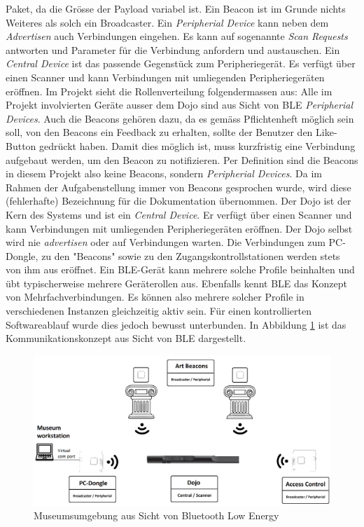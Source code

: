 Paket, da die Grösse der Payload variabel ist. Ein Beacon ist im Grunde nichts Weiteres als solch ein
Broadcaster.
Ein \textit{Peripherial Device} kann neben dem \textit{Advertisen} auch Verbindungen eingehen.
Es kann auf sogenannte \textit{Scan Requests} antworten und Parameter für die Verbindung anfordern und austauschen. 
Ein \textit{Central Device} ist das passende Gegenstück zum Peripheriegerät. Es verfügt über einen Scanner und 
kann Verbindungen mit umliegenden Peripheriegeräten eröffnen.
Im Projekt sieht die Rollenverteilung folgendermassen aus:
Alle im Projekt involvierten Geräte ausser dem Dojo sind aus Sicht von BLE \textit{Peripherial Devices}. Auch 
die Beacons gehören dazu, da es gemäss Pflichtenheft möglich sein soll, von den Beacons ein Feedback
zu erhalten, sollte der Benutzer den Like-Button gedrückt haben. Damit dies möglich ist, muss kurzfristig 
eine Verbindung aufgebaut werden, um den Beacon zu notifizieren. Per Definition sind die Beacons in
diesem Projekt also keine Beacons, sondern \textit{Peripherial Devices}. Da im Rahmen der Aufgabenstellung immer 
von Beacons gesprochen wurde, wird diese (fehlerhafte) Bezeichnung für die Dokumentation übernommen. 
Der Dojo ist der Kern des Systems und ist ein \textit{Central Device}. Er verfügt über einen Scanner und kann
Verbindungen mit umliegenden Peripheriegeräten eröffnen. Der Dojo selbst wird nie \textit{advertisen} oder auf 
Verbindungen warten. Die Verbindungen zum PC-Dongle, zu den "Beacons" sowie zu den 
Zugangskontrollstationen werden stets von ihm aus eröffnet.
Ein BLE-Gerät kann mehrere solche Profile beinhalten und übt typischerweise mehrere Geräterollen aus. 
Ebenfalls kennt BLE das Konzept von Mehrfachverbindungen. Es können also mehrere solcher Profile in
verschiedenen Instanzen gleichzeitig aktiv sein. Für einen kontrollierten Softwareablauf wurde dies 
jedoch bewusst unterbunden. In Abbildung \ref{fig:soft_1} ist das Kommunikationskonzept aus Sicht von BLE dargestellt.
\begin{figure}[h]
	\centering
	\includegraphics[width=\textwidth]{graphics/platzhalter.png}
	\caption{Museumsumgebung aus Sicht von Bluetooth Low Energy}
	\label{fig:soft_1}
\end{figure}
